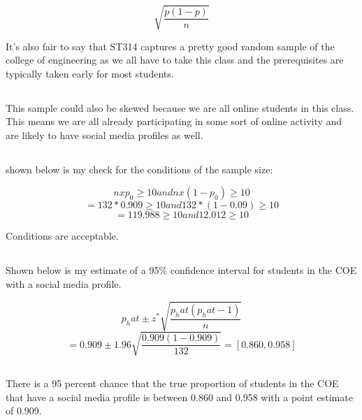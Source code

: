 \documentclass[letterpaper, onecolumn,10pt]{IEEEtran}
\begin{document}
            \[
                \sqrt{\dfrac{p(1-p)}{n}}
            \]
            
            It's also fair to say that ST314 captures a pretty good random sample of the college of engineering as we all have to take this class and the prerequisites are typically taken early for most students.\\
            
            \subsection{}
            This sample could also be skewed because we are all online students in this class. This means we are all already participating in some sort of online activity and are likely to have social media profiles as well.\\
            
            \subsection{}
            shown below is my check for the conditions of the sample size:
            
            \[
                n x p_0 \geq 10 and n x(1-p_0) \geq 10
            \]
            \[
                = 132*0.909 \geq 10 and 132 *(1-0.09) \geq 10
            \]
            \[
                = 119.988 \geq 10 and  12.012 \geq 10
            \]
            
            Conditions are acceptable.
            
            \subsection{}
            Shown below is my estimate of a 95\% confidence interval for students in the COE with a social media profile.
            
            \[
                p_hat \pm z^* \sqrt{\dfrac{p_hat(p_hat - 1)}{n}}
            \]
            \[
                = 0.909 \pm 1.96 \sqrt{\dfrac{0.909(1 - 0.909)}{132}} = [0.860, 0.958]
            \]
            
            \subsection{}
            There is a 95 percent chance that the true proportion of students in the COE that have a social media profile is between 0.860 and 0.958 with a point estimate of 0.909.\\
            
		
\end{document}
